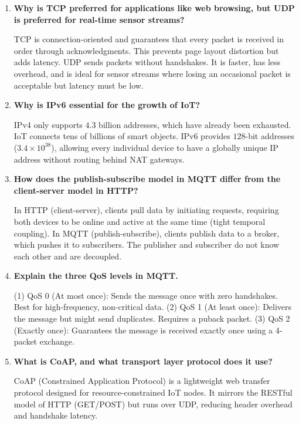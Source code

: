 \documentclass[12pt,a4paper]{article}
\newcommand{\Q}[1]{\textbf{#1}\par\noindent\ignorespaces}
\begin{document}
\begin{tcolorbox}[exambox, title={\textbf{Frequently Asked / Viva Questions}}]
\begin{enumerate}[leftmargin=*, topsep=0pt, label=\textbf{Q\arabic*.}, itemsep=6pt]
  \item \Q{Why is TCP preferred for applications like web browsing, but UDP is preferred for real-time sensor streams?}
        TCP is connection-oriented and guarantees that every packet is received in order through acknowledgments. This prevents page layout distortion but adds latency. UDP sends packets without handshakes. It is faster, has less overhead, and is ideal for sensor streams where losing an occasional packet is acceptable but latency must be low.
        
  \item \Q{Why is IPv6 essential for the growth of IoT?}
        IPv4 only supports $4.3$ billion addresses, which have already been exhausted. IoT connects tens of billions of smart objects. IPv6 provides $128$-bit addresses ($3.4 \times 10^{38}$), allowing every individual device to have a globally unique IP address without routing behind NAT gateways.
        
  \item \Q{How does the publish-subscribe model in MQTT differ from the client-server model in HTTP?}
        In HTTP (client-server), clients pull data by initiating requests, requiring both devices to be online and active at the same time (tight temporal coupling). In MQTT (publish-subscribe), clients publish data to a broker, which pushes it to subscribers. The publisher and subscriber do not know each other and are decoupled.
        
  \item \Q{Explain the three QoS levels in MQTT.}
        (1) QoS 0 (At most once): Sends the message once with zero handshakes. Best for high-frequency, non-critical data. (2) QoS 1 (At least once): Delivers the message but might send duplicates. Requires a puback packet. (3) QoS 2 (Exactly once): Guarantees the message is received exactly once using a 4-packet exchange.
        
  \item \Q{What is CoAP, and what transport layer protocol does it use?}
        CoAP (Constrained Application Protocol) is a lightweight web transfer protocol designed for resource-constrained IoT nodes. It mirrors the RESTful model of HTTP (GET/POST) but runs over UDP, reducing header overhead and handshake latency.
        

\end{enumerate}
\end{tcolorbox}
\end{document}
